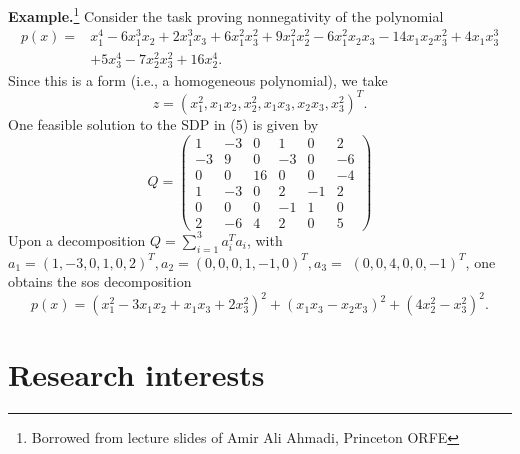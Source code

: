 \documentclass{article}
\begin{document}
\newpage
\textbf{Example.}\footnote{Borrowed from  lecture slides of Amir Ali Ahmadi, Princeton ORFE} Consider the task proving nonnegativity of the polynomial
$$
\begin{aligned}
p(x)=& x_1^4-6 x_1^3 x_2+2 x_1^3 x_3+6 x_1^2 x_3^2+9 x_1^2 x_2^2-6 x_1^2 x_2 x_3-14 x_1 x_2 x_3^2+4 x_1 x_3^3 \\
&+5 x_3^4-7 x_2^2 x_3^2+16 x_2^4 .
\end{aligned}
$$
Since this is a form (i.e., a homogeneous polynomial), we take
$$
z=\left(x_1^2, x_1 x_2, x_2^2, x_1 x_3, x_2 x_3, x_3^2\right)^T .
$$
One feasible solution to the SDP in (5) is given by
$$
Q=\left(\begin{array}{cccccc}
1 & -3 & 0 & 1 & 0 & 2 \\
-3 & 9 & 0 & -3 & 0 & -6 \\
0 & 0 & 16 & 0 & 0 & -4 \\
1 & -3 & 0 & 2 & -1 & 2 \\
0 & 0 & 0 & -1 & 1 & 0 \\
2 & -6 & 4 & 2 & 0 & 5
\end{array}\right)
$$
Upon a decomposition $Q=\sum_{i=1}^3 a_i^T a_i$, with $a_1=(1,-3,0,1,0,2)^T, a_2=(0,0,0,1,-1,0)^T, a_3=$ $(0,0,4,0,0,-1)^T$, one obtains the sos decomposition
$$
p(x)=\left(x_1^2-3 x_1 x_2+x_1 x_3+2 x_3^2\right)^2+\left(x_1 x_3-x_2 x_3\right)^2+\left(4 x_2^2-x_3^2\right)^2 .
$$

\newpage
\section{Research interests}
\end{document}
